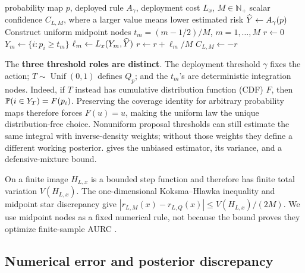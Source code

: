 \begin{algorithm}[t]
\caption{Uniform-midpoint risk-aligned confidence}
\label{alg:risk-aligned-confidence}
\small
\begin{algorithmic}[1]
\Require probability map \(p\), deployed rule \(A_\gamma\), deployment cost \(L_x\), \(M\in\mathbb N_+\)
\Ensure scalar confidence \(C_{L,M}\), where a larger value means lower estimated risk
\State \(\widehat{Y}\gets A_\gamma(p)\) 
\State Construct uniform midpoint nodes \(t_m=(m-1/2)/M\), \(m=1,\ldots,M\)
\State \(r\gets0\) 
  \State \(Y_m\gets\{i:p_i\geq t_m\}\) 
  \State \(\ell_m\gets L_x(Y_m,\widehat{Y})\) 
  \State \(r\gets r+\ell_m/M\) 
\EndFor
\State \Return \(C_{L,M}\gets-r\) 
\end{algorithmic}
\end{algorithm}

The \textbf{three threshold roles are distinct}. The deployment threshold \(\gamma\)
fixes the action; \(T\sim\operatorname{Unif}(0,1)\) defines \(Q_p\); and the
\(t_m\)'s are deterministic integration nodes. Indeed, if \(T\) instead has
cumulative distribution function (CDF)
\(F\), then \(\mathbb{P}(i\in Y_T)=F(p_i)\). Preserving the coverage identity for
arbitrary probability maps therefore forces \(F(u)=u\), making the uniform law
the unique distribution-free choice. Nonuniform proposal thresholds can still
estimate the same integral with inverse-density weights; without those weights
they define a different working posterior. 
gives the unbiased estimator, its variance, and a defensive-mixture bound.

On a finite image \(H_{L,x}\) is a bounded step function and therefore has
finite total variation \(V(H_{L,x})\). The one-dimensional Koksma--Hlawka
inequality and midpoint star discrepancy give
\(\left|r_{L,M}(x)-r_{L,Q}(x)\right|\leq V(H_{L,x})/(2M)\).
We use midpoint nodes as a fixed numerical rule, not because the bound proves
they optimize finite-sample AURC \citep{niederreiter1992}.

\subsection{Numerical error and posterior discrepancy}
\label{sec:error}


